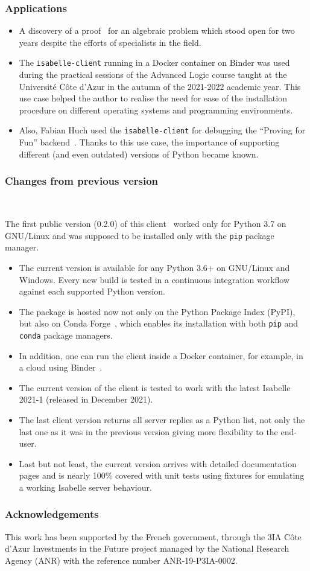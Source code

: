 \subsubsection{Applications}
\begin{itemize}
\item A discovery of a proof~\cite{FussnerShminke} for an algebraic problem which stood open for two years despite the efforts of specialists in the field.
\item The \texttt{isabelle-client} running in a Docker container on Binder was used during the practical sessions of the Advanced Logic course taught at the Université Côte d'Azur in the autumn of the 2021-2022 academic year. This use case helped the author to realise the need for ease of the installation procedure on different operating systems and programming environments.
\item Also, Fabian Huch used the \texttt{isabelle-client} for debugging the ``Proving for Fun'' backend~\cite{haslbeck2019competitive}. Thanks to this use case, the importance of supporting different (and even outdated) versions of Python became known.
\end{itemize}
\subsubsection{Changes from previous version}~

The first public version (0.2.0) of this client~\cite{DBLP:conf/mkm/LiskaLNRSSSW21} worked only for Python 3.7 on GNU/Linux and was supposed to be installed only with the \texttt{pip} package manager.
\begin{itemize}
\item The current version is available for any Python 3.6+ on GNU/Linux and Windows. Every new build is tested in a continuous integration workflow against each supported Python version.
\item The package is hosted now not only on the Python Package Index (PyPI), but also on Conda Forge~\cite{conda_forge_community_2015_4774216}, which enables its installation with both \texttt{pip} and \texttt{conda} package managers.
\item In addition, one can run the client inside a Docker container, for example, in a cloud using Binder~\cite{project_jupyter-proc-scipy-2018}.
\item The current version of the client is tested to work with the latest Isabelle 2021-1 (released in December 2021).
\item The last client version returns all server replies as a Python list, not only the last one as it was in the previous version giving more flexibility to the end-user.
\item Last but not least, the current version arrives with detailed documentation pages and is nearly 100\% covered with unit tests using fixtures for emulating a working Isabelle server behaviour.
\end{itemize}
\subsubsection{Acknowledgements}
This work has been supported by the French government, through the 3IA Côte d'Azur Investments in the Future project managed by the National Research Agency (ANR) with the reference number ANR-19-P3IA-0002.
